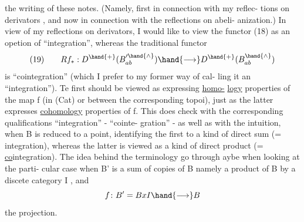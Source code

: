 
the writing of these notes. (Namely, first in connection with my reflec-%
tions on derivators , and now in connection with the reflections on abeli-%
anization.) In view of my reflections on derivators, I would like to
view the functor (18) as an opetion of ``integration'', whereas the
traditional functor
\[ \text{(19)} \qquad Rf_{*} : D^{\hand{+}}(B'^{\hand{\wedge}}_{ab}) \hand{\longrightarrow} D^{\hand{+}}(B^{\hand{\wedge}}_{ab}) \]
is   ``cointegration'' (which I prefer to my former way of cal-%
ling it an ``integration''). Te first should be viewed as expressing \uline{homo-}%
\uline{logy} properties of the map f (in (Cat)\unsure{\deleted{,}} \hand{(}or between the corresponding
topoi), just as the latter expresses \uline{cohomology} properties of f. \deleted{(}This
does check with the corresponding qualifications ``integration'' - ``cointe-%
gration'' - as well as with the intuition, when B is reduced to a point,
identifying the first to a kind of direct sum (= integration), whereas
the latter is viewed as a kind of direct product (= \uline{co}integration). The
idea behind the terminology  go through aybe when looking at the parti-%
cular case when B' is  a sum of copies of B\hand{,} namely a product of B
by a discete category I , and 
\[ f\colon B' = BxI \hand{\longrightarrow} B \]
the projection.

